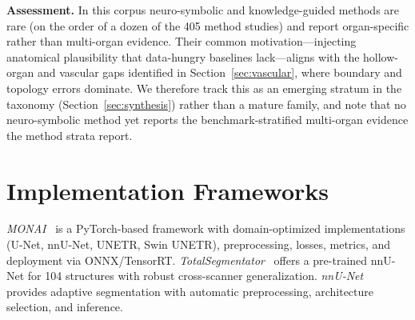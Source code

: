 \textbf{Assessment.} In this corpus neuro-symbolic and knowledge-guided methods are rare (on the order of a dozen of the 405 method studies) and report organ-specific rather than multi-organ evidence. Their common motivation---injecting anatomical plausibility that data-hungry baselines lack---aligns with the hollow-organ and vascular gaps identified in Section~\ref{sec:vascular}, where boundary and topology errors dominate. We therefore track this as an emerging stratum in the taxonomy (Section~\ref{sec:synthesis}) rather than a mature family, and note that no neuro-symbolic method yet reports the benchmark-stratified multi-organ evidence the method strata report.

\section{Implementation Frameworks}
\label{sec:frameworks}

\emph{MONAI}~\cite{monai2022} is a PyTorch-based framework with domain-optimized implementations (U-Net, nnU-Net, UNETR, Swin UNETR), preprocessing, losses, metrics, and deployment via ONNX/TensorRT. \emph{TotalSegmentator}~\cite{wasserthal2023totalsegmentator} offers a pre-trained nnU-Net for 104 structures with robust cross-scanner generalization. \emph{nnU-Net}~\cite{isensee2021nnunet} provides adaptive segmentation with automatic preprocessing, architecture selection, and inference.

